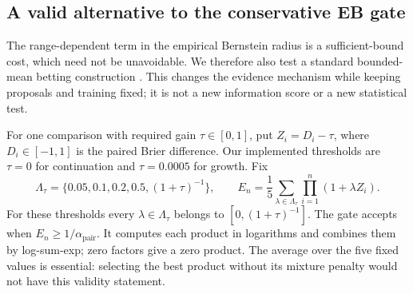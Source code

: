 \subsection{A valid alternative to the conservative EB gate}
\label{sec:betting-gate}

The range-dependent term in the empirical Bernstein radius is a
sufficient-bound cost, which need not be unavoidable. We therefore also
test a standard bounded-mean betting construction
\cite[Section 4]{waudby2024}. This changes the evidence mechanism while
keeping proposals and training fixed; it is not a new information score
or a new statistical test.

For one comparison with required gain $\tau\in[0,1]$, put $Z_i=D_i-\tau$,
where $D_i\in[-1,1]$ is the paired Brier difference. Our implemented
thresholds are $\tau=0$ for continuation and $\tau=0.0005$ for growth.
Fix
\[
 \Lambda_\tau=\{0.05,0.1,0.2,0.5,(1+\tau)^{-1}\},\qquad
 E_n=\frac15\sum_{\lambda\in\Lambda_\tau}
          \prod_{i=1}^n(1+\lambda Z_i).
\]
For these thresholds every $\lambda\in\Lambda_\tau$ belongs to
$[0,(1+\tau)^{-1}]$. The gate accepts when $E_n\ge1/\alpha_\mathrm{pair}$.
It computes each product in logarithms and combines them by log-sum-exp;
zero factors give a zero product. The average over the five fixed values
is essential: selecting the best product without its mixture penalty
would not have this validity statement.

